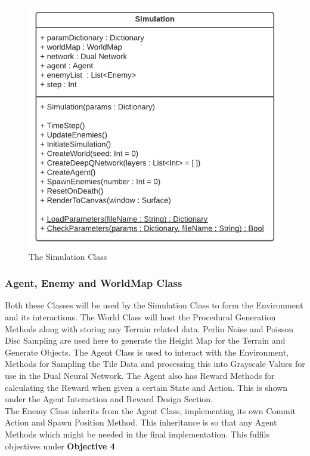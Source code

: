 \begin{flushleft}
                \begin{figure}[H]
                    \centering
                    \includegraphics[width=.6\textwidth]{Images/Design/Classes/Simulation.png} 
                    \caption*{The Simulation Class}
                \end{figure}
            \subsubsection{Agent, Enemy and WorldMap Class}
                Both these Classes will be used by the Simulation Class to form the Environment and its interactions. The World Class will host the
                Procedural Generation Methods along with storing any Terrain related data. Perlin Noise and Poisson Disc Sampling are used here to
                generate the Height Map for the Terrain and Generate Objects. The Agent Class is used to interact with the Environment, Methods for 
                Sampling the Tile Data and processing this into Grayscale Values for use in the Dual Neural Network. The Agent also has Reward Methods
                for calculating the Reward when given a certain State and Action. This is shown under the Agent Interaction and Reward Design Section. \\
                \vspace{0.2cm}
                The Enemy Class inherits from the Agent Class, implementing its own Commit Action and Spawn Position Method. This inheritance is so 
                that any Agent Methods which might be needed in the final implementation.
                \vspace{0.2cm}
                This fulfils objectives under \textbf{Objective 4} \\


\end{flushleft}
